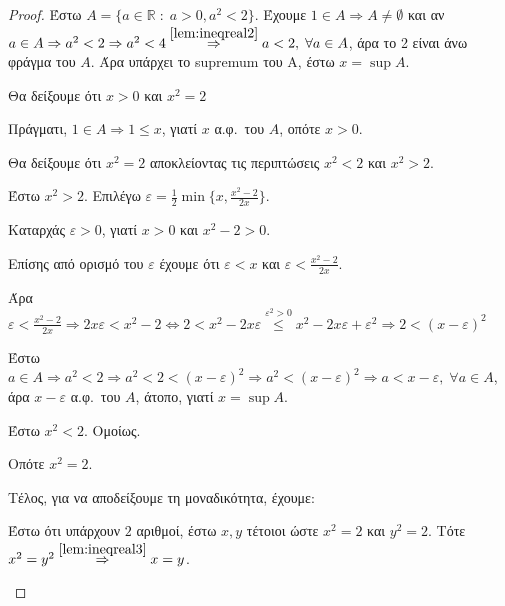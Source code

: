 \documentclass[main.tex]{subfiles}
\begin{document}
\begin{proof}
\item {}
  Έστω $ A = \{ a \in \mathbb{R} \; : \; a > 0, a^{2} < 2 \}  $. Έχουμε $ 1 \in A 
  \Rightarrow A \neq \emptyset $ 
  και αν $ a \in A \Rightarrow a^{2} < 2 \Rightarrow a^{2} < 4
  \overset{\ref{lem:ineqreal2}}{\Rightarrow} a <2,\; \forall a \in A $, 
  άρα το 2 είναι άνω φράγμα του $A$. Άρα υπάρχει το supremum του Α, έστω 
  $ x = \sup A $. 

  Θα δείξουμε ότι $ x > 0 $ και $ x^{2} = 2 $

  Πράγματι, $ 1 \in A \Rightarrow 1 \leq x $, γιατί $x$ α.φ.\ του $A$, οπότε $ x >0 $.

  Θα δείξουμε ότι $ x^{2} = 2 $ αποκλείοντας τις περιπτώσεις $ x^{2} <2 $ και 
  $ x^{2} > 2 $.
  \begin{myitemize}
    \item Έστω $ x^{2} > 2 $. Επιλέγω $ \varepsilon = \frac{1}{2} \min \{ x, 
      \frac{x^{2}-2}{2x}\} $.

      Καταρχάς $ \varepsilon > 0 $, γιατί $ x>0 $ και $ x^{2} -2 >0 $. 

      Επίσης από ορισμό του $ \varepsilon $ έχουμε ότι  $\varepsilon < x $ και 
      $ \varepsilon < \frac{x^{2}-2}{2x}$. 

      Άρα $ \varepsilon < \frac{x^{2}-2}{2x} \Rightarrow 
      2x \varepsilon < x^{2} - 2 \Leftrightarrow 2 < x^{2} -2x \varepsilon 
      \overset{\varepsilon ^{2}>0}{\leq}
      x^{2} -2x \varepsilon + \varepsilon ^{2} \Rightarrow 2 
      < (x- \varepsilon )^{2}   $

      Έστω $ a \in A \Rightarrow a^{2} <2 \Rightarrow a^{2}<2< 
      (x- \varepsilon )^{2} \Rightarrow a^{2}< (x- \varepsilon )^{2} 
      \Rightarrow a < x- \varepsilon, \; \forall a \in A$, 
      άρα $ x - \varepsilon $ α.φ.\ του $A$, άτοπο, γιατί $ x= \sup A $.

    \item Έστω $ x^{2}<2 $. Ομοίως.

      Οπότε $ x^{2}=2 $. 

      Τέλος, για να αποδείξουμε τη μοναδικότητα, έχουμε:

      Έστω ότι υπάρχουν $ 2 $ αριθμοί, έστω $ x,y $ τέτοιοι ώστε $ x^{2} =2 $ 
      και $ y^{2}=2 $. Τότε $ x^{2}=y^{2} \overset{\ref{lem:ineqreal3}}
      {\Rightarrow} x =y $.
  \end{myitemize}
\end{proof}

\end{document}
